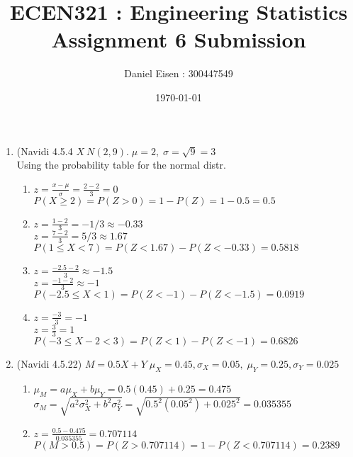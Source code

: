 \documentclass[11pt]{article}
\title{ECEN321 : Engineering Statistics \\ Assignment 6 Submission}
\author{Daniel Eisen : 300447549}
\date{\today}
\begin{document}
\begin{preview}

\maketitle
\begin{enumerate}
\section*{Normal Distribution}
\item (Navidi 4.5.4 $X ~ N(2,9). \; \mu=2, \; \sigma =\sqrt{9} = 3$ \\
Using the probability table for the normal distr.
\begin{enumerate}
        \item $z = \frac{x - \mu}{\sigma} = \frac{2-2}{3} = 0$ \\
        $P(X \ge 2) = P(Z>0) = 1-P(Z) = 1-0.5 = 0.5$

        \item $z = \frac{1-2}{3} = -1/3 \approx -0.33$ \\
        $z = \frac{7-2}{3} = 5/3 \approx 1.67$ \\
        $P(1 \le X < 7) = P(Z < 1.67) - P(Z < -0.33) = 0.5818$

        \item $z = \frac{-2.5-2}{3} \approx -1.5$ \\
        $z = \frac{-1-2}{3}\approx -1$ \\
        $P(-2.5 \le X < 1) = P(Z < -1) - P(Z < -1.5) = 0.0919$

        \item $z = \frac{-3}{3} = -1$ \\
        $z = \frac{3}{3} = 1$ \\
        $P(-3 \le X-2 < 3) = P(Z < 1) - P(Z < -1) = 0.6826$
\end{enumerate}
\item (Navidi 4.5.22) $M = 0.5X + Y \; \mu_X=0.45, \sigma_X=0.05,\; \mu_Y=0.25,\sigma_Y=0.025$
\begin{enumerate}
        \item $\mu_M = a\mu_X + b\mu_Y = 0.5(0.45) + 0.25=0.475$\\
        $\sigma_M = \sqrt{a^2\sigma_X^2 + b^2\sigma_Y^2} = \sqrt{0.5^2(0.05^2) + 0.025^2}=0.035355$
        \item $z = \frac{0.5 - 0.475}{0.035355} = 0.707114$ \\
        $P(M>0.5) = P(Z > 0.707114) = 1-P(Z<0.707114) = 0.2389$
\end{enumerate}


\end{enumerate}
\end{preview}
\end{document}
